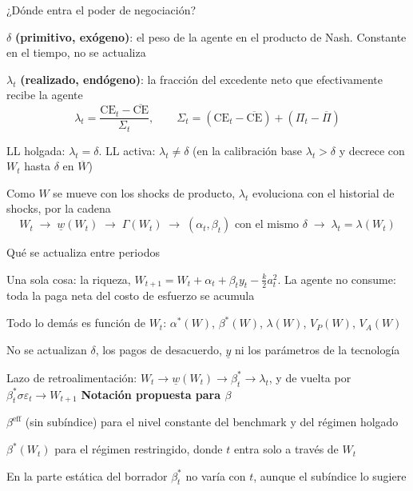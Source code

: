 \documentclass[12pt, aspectratio=169]{beamer}
\newenvironment{wideitemize}{\itemize\addtolength{\itemsep}{3pt}}{\enditemize}
\newcommand{\CE}{\text{CE}}
\newcommand{\eff}{\text{eff}}
\begin{document}
\begin{frame}{¿Dónde entra el poder de negociación?}
    \begin{wideitemize}
        \item $\delta$ \textbf{(primitivo, exógeno)}: el peso de la agente en el producto de Nash. Constante en el tiempo, no se actualiza
        \item $\lambda_t$ \textbf{(realizado, endógeno)}: la fracción del excedente neto que efectivamente recibe la agente
    \end{wideitemize}
    {\small
    \[
    \lambda_t=\frac{\CE_t-\overline{\CE}}{\Sigma_t},\qquad
    \Sigma_t=(\CE_t-\overline{\CE})+(\Pi_t-\overline{\Pi})
    \]}
    \begin{wideitemize}
        \item LL holgada: $\lambda_t=\delta$. LL activa: $\lambda_t\ne\delta$ (en la calibración base $\lambda_t>\delta$ y decrece con $W_t$ hasta $\delta$ en $\overline{W}$)
        \item Como $W$ se mueve con los shocks de producto, $\lambda_t$ evoluciona con el historial de shocks, por la cadena
    \end{wideitemize}
    {\small
    \[
    W_t\;\to\;\underline{w}(W_t)\;\to\;\Gamma(W_t)\;\to\;(\alpha_t,\beta_t)\text{ con el mismo }\delta\;\to\;\lambda_t=\lambda(W_t)
    \]}
\end{frame}

\begin{frame}{Qué se actualiza entre periodos}
    \begin{wideitemize}
        \item Una sola cosa: la riqueza, $W_{t+1}=W_t+\alpha_t+\beta_t y_t-\tfrac{k}{2}a_t^2$. La agente no consume: toda la paga neta del costo de esfuerzo se acumula
        \item Todo lo demás es función de $W_t$: $\alpha^*(W)$, $\beta^*(W)$, $\lambda(W)$, $V_P(W)$, $V_A(W)$
        \item No se actualizan $\delta$, los pagos de desacuerdo, $\underline{y}$ ni los parámetros de la tecnología
        \item Lazo de retroalimentación: $W_t\to\underline{w}(W_t)\to\beta^*_t\to\lambda_t$, y de vuelta por $\beta^*_t\sigma\varepsilon_t\to W_{t+1}$
    \end{wideitemize}
    \textbf{Notación propuesta para $\beta$}
    \begin{wideitemize}
        \item $\beta^{\eff}$ (sin subíndice) para el nivel constante del benchmark y del régimen holgado
        \item $\beta^*(W_t)$ para el régimen restringido, donde $t$ entra solo a través de $W_t$
        \item En la parte estática del borrador $\beta^*_t$ no varía con $t$, aunque el subíndice lo sugiere
    \end{wideitemize}
\end{frame}
\end{document}
